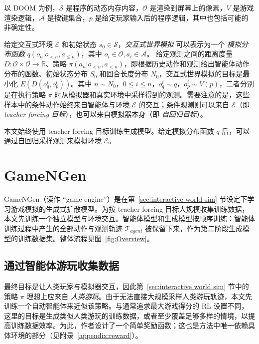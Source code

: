 \documentclass{article} %
\begin{document}
以 DOOM 为例，$\mathcal{S}$ 是程序的动态内存内容，$\mathcal{O}$ 是渲染到屏幕上的像素，$V$ 是游戏渲染逻辑，$\mathcal{A}$ 是按键集合，$p$ 是给定玩家输入后的程序逻辑，其中也包括可能的非确定性。

给定交互式环境 $\mathcal{E}$ 和初始状态 $s_0 \in \mathcal{S}$，\emph{交互式世界模拟} 可以表示为一个 \emph{模拟分布函数} $q(o_n| o_{<n}, a_{\le n})$，其中 $o_i \in \mathcal{O}, a_i \in \mathcal{A}$。
给定观测之间的距离度量 $D:\mathcal{O}\times\mathcal{O} \to \mathbb{R}$、策略 $\pi(a_n|o_{<n}, a_{<n})$，即根据历史动作和观测给出智能体动作分布的函数、初始状态分布 $S_0$ 和回合长度分布 $N_0$，交互式世界模拟的目标是最小化 $E(D(o_q^i, o_p^i))$。其中 $n \sim N_0$，$0 \le i \le n$，$o_q^i \sim q$，$o_p^i \sim V(p)$，二者分别是在执行策略 $\pi$ 时从模拟器和真实环境中采样得到的观测。需要注意的是，这些样本中的条件动作始终来自智能体与环境 $\mathcal{E}$ 的交互；条件观测则可以来自 $\mathcal{E}$（即 \emph{teacher forcing 目标}），也可以来自模拟器本身（即 \emph{自回归目标}）。

本文始终使用 teacher forcing 目标训练生成模型。给定模拟分布函数 $q$ 后，可以通过自回归采样观测来模拟环境 $\mathcal{E}$。


\section{GameNGen}
\label{sec:method}

GameNGen（读作 “game engine”）是在第~\ref{sec:interactive world sim} 节设定下学习游戏模拟的生成式扩散模型。为按 teacher forcing 目标大规模收集训练数据，本文先训练一个独立模型与环境交互。智能体模型和生成模型按顺序训练：智能体训练过程中产生的全部动作与观测轨迹 $\mathcal{T}_{agent}$ 被保留下来，作为第二阶段生成模型的训练数据集。整体流程见图~\ref{fig:Overview}。



\subsection{通过智能体游玩收集数据}
\label{agent-play}

最终目标是让人类玩家与模拟器交互，因此第~\ref{sec:interactive world sim} 节中的策略 $\pi$ 理想上应来自 \emph{人类游玩}。由于无法直接大规模采样人类游玩轨迹，本文先训练一个自动智能体来近似该策略。与通常追求最大游戏得分的 RL 设置不同，这里的目标是生成类似人类游玩的训练数据，或者至少覆盖足够多样的情境，以提高训练数据效率。为此，作者设计了一个简单奖励函数；这也是方法中唯一依赖具体环境的部分（见附录~\ref{appendix:reward}）。
\end{document}
